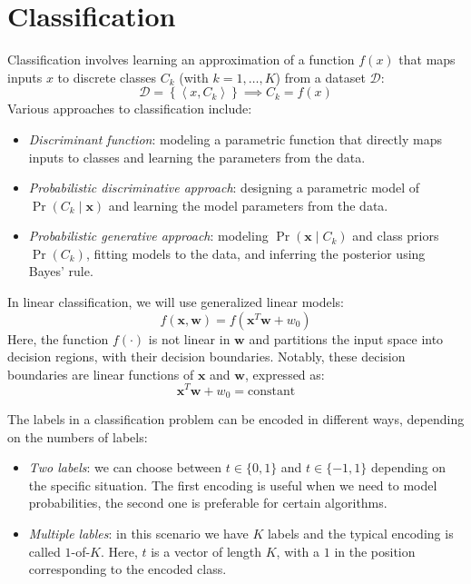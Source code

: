 \section{Classification}

Classification involves learning an approximation of a function $f(x)$ that maps inputs $x$ to discrete classes $C_k$ (with $k=1,\dots,K$) from a dataset $\mathcal{D}$: 
\[\mathcal{D}=\left\{ \left\langle x,C_k \right\rangle \right\} \implies C_k=f(x)\]
Various approaches to classification include:
\begin{itemize}
    \item \textit{Discriminant function}: modeling a parametric function that directly maps inputs to classes and learning the parameters from the data.
    \item \textit{Probabilistic discriminative approach}: designing a parametric model of $\Pr(C_k\mid\textbf{x})$ and learning the model parameters from the data.
    \item \textit{Probabilistic generative approach}: modeling $\Pr(\textbf{x}\mid C_k)$ and class priors $\Pr(C_k)$, fitting models to the data, and inferring the posterior using Bayes' rule.
\end{itemize}
In linear classification, we will use generalized linear models: 
\[f(\textbf{x},\textbf{w})=f(\textbf{x}^T\textbf{w}+w_0)\]
Here, the function $f(\cdot)$ is not linear in $\textbf{w}$ and partitions the input space into decision regions, with their decision boundaries.
Notably, these decision boundaries are linear functions of $\textbf{x}$ and $\textbf{w}$, expressed as:
\[\textbf{x}^T\textbf{w}+w_0=\text{constant}\]

The labels in a classification problem can be encoded in different ways, depending on the numbers of labels: 
\begin{itemize}
    \item \textit{Two labels}: we can choose between $t \in \{0,1\}$ and $t \in \{-1,1\}$ depending on the specific situation. 
        The first encoding is useful when we need to model probabilities, the second one is preferable for certain algorithms. 
    \item \textit{Multiple lables}: in this scenario we have $K$ labels and the typical encoding is called $1$-of-$K$. 
        Here, $t$ is a vector of length $K$, with a $1$  in the position corresponding to the encoded class.
\end{itemize}

